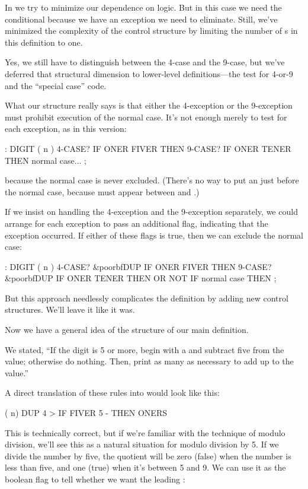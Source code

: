 In \Forth{} we try to minimize our dependence on logic. But in this case
we need the conditional  because we have an exception we need
to eliminate. Still, we've minimized the complexity of the control
structure by limiting the number of s in this
definition to one.

Yes, we still have to distinguish between the 4-case and the 9-case,
but we've deferred that structural dimension to lower-level
definitions---the test for 4-or-9 and the ``special case'' code.

What our structure really says is that either the 4-exception or the
9-exception must prohibit execution of the normal case. It's not enough
merely to test for each exception, as in this version:

\begin{Code}
: DIGIT  ( n )  4-CASE? IF  ONER FIVER  THEN
                9-CASE? IF  ONER TENER  THEN
                normal case... ;
\end{Code}
because the normal case is never excluded. (There's no way to put an
 just before the normal case, because  must
appear between  and .)

If we insist on handling the 4-exception and the 9-exception separately,
we could arrange for each exception to pass an additional flag, indicating
that the exception occurred. If either of these flags is true, then we can
exclude the normal case:

\begin{Code}[commandchars=\&\{\}]
: DIGIT  ( n )  4-CASE? &poorbf{DUP} IF  ONER FIVER  THEN
                9-CASE? &poorbf{DUP} IF  ONER TENER  THEN
                OR  NOT IF normal case THEN ;
\end{Code}
But this approach needlessly complicates the definition by adding new
control structures. We'll leave it like it was.

Now we have a general idea of the structure of our main definition.

We stated, ``If the digit is 5 or more, begin with a  and
subtract five from the value; otherwise do nothing. Then, print as many
 as necessary to add up to the value.''

A direct translation of these rules into \Forth{} would look like this:

\begin{Code}
( n)  DUP  4 > IF  FIVER 5 -  THEN  ONERS
\end{Code}
This is technically correct, but if we're familiar with the technique of
modulo division, we'll see this as a natural situation for modulo division
by 5. If we divide the number by five, the quotient will be zero (false)
when the number is less than five, and one (true) when it's between 5 and
9. We can use it as the boolean flag to tell whether we want the leading
:


